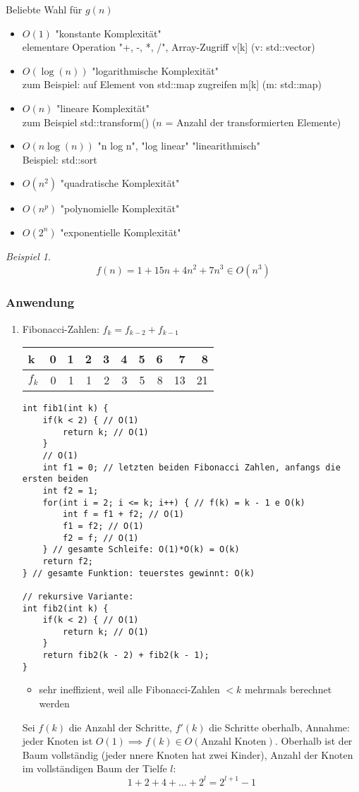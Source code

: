 \documentclass[a4paper]{scrartcl}
\theoremstyle{definition}
\theoremstyle{plain}
\theoremstyle{remark}
\theoremstyle{remark}
\newtheorem{ex}{Beispiel}
\begin{document}
Beliebte Wahl für $g(n)$
\begin{itemize}
\item $O(1)$ \hfill "konstante Komplexität" \\
      elementare Operation "+, -, *, /", Array-Zugriff v[k] (v: std::vector)
\item $O(\log(n))$ \hfill "logarithmische Komplexität" \\
      zum Beispiel: auf Element von std::map zugreifen m[k] (m: std::map)
\item $O(n)$ \hfill "lineare Komplexität" \\
      zum Beispiel std::transform() ($n$ = Anzahl der transformierten Elemente)
\item $O(n \log(n))$ \hfill{"n log n", "log linear" "linearithmisch"} \\
      Beispiel: std::sort
\item $O(n^2)$ \hfill "quadratische Komplexität"
\item $O(n^p)$ \hfill "polynomielle Komplexität"
\item $O(2^n)$ \hfill "exponentielle Komplexität"
\end{itemize}
\begin{ex}
\[f(n) = 1 + 15 n + 4n^2 + 7n^3 \in O(n^3)\]
\end{ex}
\subsubsection{Anwendung}
\label{sec-15-1-3}
\begin{enumerate}
\item Fibonacci-Zahlen: $f_k = f_{k - 2} + f_{k - 1}$
\begin{center}
\begin{tabular}{lrrrrrrrrr}
k & 0 & 1 & 2 & 3 & 4 & 5 & 6 & 7 & 8\\
\hline
$f_k$ & 0 & 1 & 1 & 2 & 3 & 5 & 8 & 13 & 21\\
\end{tabular}
\end{center}
\begin{verbatim}
int fib1(int k) {
	if(k < 2) { // O(1)
		return k; // O(1)
	}
	// O(1)
	int f1 = 0; // letzten beiden Fibonacci Zahlen, anfangs die ersten beiden
	int f2 = 1;
	for(int i = 2; i <= k; i++) { // f(k) = k - 1 e O(k)
		int f = f1 + f2; // O(1)
		f1 = f2; // O(1)
		f2 = f; // O(1)
	} // gesamte Schleife: O(1)*O(k) = O(k)
	return f2;
} // gesamte Funktion: teuerstes gewinnt: O(k)

// rekursive Variante:
int fib2(int k) {
	if(k < 2) { // O(1)
		return k; // O(1)
	}
	return fib2(k - 2) + fib2(k - 1);
}
\end{verbatim}
\begin{itemize}
\item sehr ineffizient, weil alle Fibonacci-Zahlen $< k$  mehrmals berechnet werden
\end{itemize}
Sei $f(k)$  die Anzahl der Schritte, $f'(k)$ die Schritte oberhalb, Annahme: jeder Knoten ist $O(1) \implies f(k) \in O(\text{Anzahl Knoten})$.
Oberhalb ist der Baum vollständig (jeder nnere Knoten hat zwei Kinder), Anzahl der Knoten im vollständigen Baum der Tielfe $l$:
\[1 + 2 + 4 + \ldots + 2^l = 2^{l + 1} - 1\]
\end{enumerate}
\end{document}
